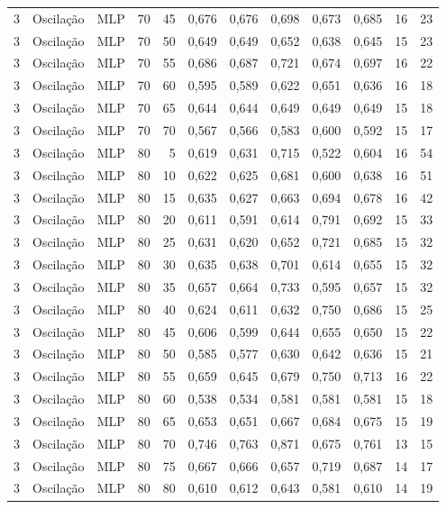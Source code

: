 \begin{longtable}{@{}rllrrrrrrrrr@{}}
3 & Oscilação & MLP & 70 & 45 & 0,676 & 0,676 & 0,698 & 0,673 & 0,685 & 16 & 23 \\
3 & Oscilação & MLP & 70 & 50 & 0,649 & 0,649 & 0,652 & 0,638 & 0,645 & 15 & 23 \\
3 & Oscilação & MLP & 70 & 55 & 0,686 & 0,687 & 0,721 & 0,674 & 0,697 & 16 & 22 \\
3 & Oscilação & MLP & 70 & 60 & 0,595 & 0,589 & 0,622 & 0,651 & 0,636 & 16 & 18 \\
3 & Oscilação & MLP & 70 & 65 & 0,644 & 0,644 & 0,649 & 0,649 & 0,649 & 15 & 18 \\
3 & Oscilação & MLP & 70 & 70 & 0,567 & 0,566 & 0,583 & 0,600 & 0,592 & 15 & 17 \\
3 & Oscilação & MLP & 80 & 5 & 0,619 & 0,631 & 0,715 & 0,522 & 0,604 & 16 & 54 \\
3 & Oscilação & MLP & 80 & 10 & 0,622 & 0,625 & 0,681 & 0,600 & 0,638 & 16 & 51 \\
3 & Oscilação & MLP & 80 & 15 & 0,635 & 0,627 & 0,663 & 0,694 & 0,678 & 16 & 42 \\
3 & Oscilação & MLP & 80 & 20 & 0,611 & 0,591 & 0,614 & 0,791 & 0,692 & 15 & 33 \\
3 & Oscilação & MLP & 80 & 25 & 0,631 & 0,620 & 0,652 & 0,721 & 0,685 & 15 & 32 \\
3 & Oscilação & MLP & 80 & 30 & 0,635 & 0,638 & 0,701 & 0,614 & 0,655 & 15 & 32 \\
3 & Oscilação & MLP & 80 & 35 & 0,657 & 0,664 & 0,733 & 0,595 & 0,657 & 15 & 32 \\
3 & Oscilação & MLP & 80 & 40 & 0,624 & 0,611 & 0,632 & 0,750 & 0,686 & 15 & 25 \\
3 & Oscilação & MLP & 80 & 45 & 0,606 & 0,599 & 0,644 & 0,655 & 0,650 & 15 & 22 \\
3 & Oscilação & MLP & 80 & 50 & 0,585 & 0,577 & 0,630 & 0,642 & 0,636 & 15 & 21 \\
3 & Oscilação & MLP & 80 & 55 & 0,659 & 0,645 & 0,679 & 0,750 & 0,713 & 16 & 22 \\
3 & Oscilação & MLP & 80 & 60 & 0,538 & 0,534 & 0,581 & 0,581 & 0,581 & 15 & 18 \\
3 & Oscilação & MLP & 80 & 65 & 0,653 & 0,651 & 0,667 & 0,684 & 0,675 & 15 & 19 \\
3 & Oscilação & MLP & 80 & 70 & 0,746 & 0,763 & 0,871 & 0,675 & 0,761 & 13 & 15 \\
3 & Oscilação & MLP & 80 & 75 & 0,667 & 0,666 & 0,657 & 0,719 & 0,687 & 14 & 17 \\
3 & Oscilação & MLP & 80 & 80 & 0,610 & 0,612 & 0,643 & 0,581 & 0,610 & 14 & 19 \\

\end{longtable}
